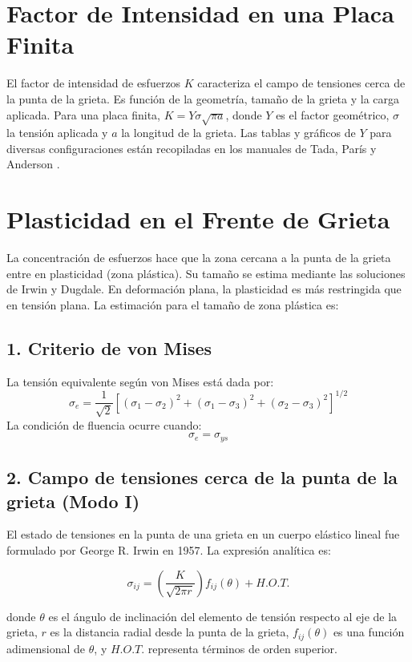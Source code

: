 \documentclass[12pt,letterpaper]{article}
\begin{document}
\section{Factor de Intensidad en una Placa Finita}

El factor de intensidad de esfuerzos $K$ caracteriza el campo de tensiones cerca de la punta de la grieta. Es función de la geometría, tamaño de la grieta y la carga aplicada. Para una placa finita, $K = Y\sigma\sqrt{\pi a}$, donde $Y$ es el factor geométrico, $\sigma$ la tensión aplicada y $a$ la longitud de la grieta. Las tablas y gráficos de $Y$ para diversas configuraciones están recopiladas en los manuales de Tada, París y Anderson \cite{Broek1982, Cameron2022, Jaramillo2008, MechanicalBehavior2022}.
\section{Plasticidad en el Frente de Grieta}

La concentración de esfuerzos hace que la zona cercana a la punta de la grieta entre en plasticidad (zona plástica). Su tamaño se estima mediante las soluciones de Irwin y Dugdale. En deformación plana, la plasticidad es más restringida que en tensión plana. La estimación para el tamaño de zona plástica es:
\subsection*{1. Criterio de von Mises}
La tensión equivalente según von Mises está dada por:
\[
\sigma_e = \frac{1}{\sqrt{2}} \left[ (\sigma_1 - \sigma_2)^2 + (\sigma_1 - \sigma_3)^2 + (\sigma_2 - \sigma_3)^2 \right]^{1/2}
\]
La condición de fluencia ocurre cuando:
\[
\sigma_e = \sigma_{ys}
\]

\subsection*{2. Campo de tensiones cerca de la punta de la grieta (Modo I)}
El estado de tensiones en la punta de una grieta en un cuerpo elástico lineal fue formulado por George R. Irwin en 1957. La expresión analítica es:

\[
\sigma_{ij} = \left(\frac{K}{\sqrt{2\pi r}}\right) f_{ij}(\theta) + H.O.T.
\]

donde $\theta$ es el ángulo de inclinación del elemento de tensión respecto al eje de la grieta, $r$ es la distancia radial desde la punta de la grieta, $f_{ij}(\theta)$ es una función adimensional de $\theta$, y $H.O.T.$ representa términos de orden superior.
\end{document}
